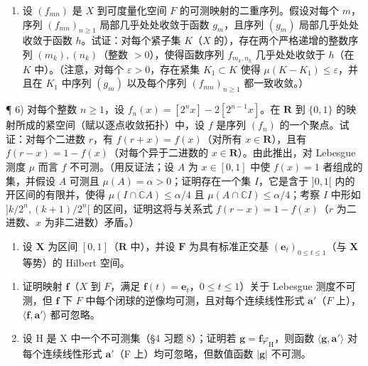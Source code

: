 \begin{enumerate}
\def\labelenumi{\arabic{enumi})}
\setcounter{enumi}{4}
\tightlist
\item
  设 \((f_{mn})\) 是 \(X\) 到可度量化空间 \(F\) 的可测映射的二重序列。假设对每个 \(m\)，序列 \((f_{mn})_{n\geqslant 1}\) 局部几乎处处收敛于函数 \(g_{m}\)，且序列 \((g_{m})\) 局部几乎处处收敛于函数 \(h\)。试证：对每个紧子集 \(K\)（\(X\) 的），存在两个严格递增的整数序列 \((m_k),(n_k)\)（整数 \(>0\)），使得函数序列 \(f_{m_k,n_k}\) 几乎处处收敛于 \(h\)（在 \(K\) 中）。（注意，对每个 \(\varepsilon >0\)，存在紧集 \(K_1\subset K\) 使得 \(\mu (K - K_1)\leqslant \varepsilon\)，并且在 \(K_{1}\) 中序列 \((g_{m})\) 以及每个序列 \((f_{mn})_{n\geqslant 1}\) 都一致收敛。）
\end{enumerate}

¶ 6) 对每个整数 \(n \geqslant 1\)，设 \(f_n(x) = [2^n x] - 2[2^{n-1}x]\)。在 \(\mathbf{R}\) 到 \(\{0,1\}\) 的映射所成的紧空间（赋以逐点收敛拓扑）中，设 \(f\) 是序列 \((f_n)\) 的一个聚点。试证：对每个二进数 \(r\)，有 \(f(r+x) = f(x)\)（对所有 \(x \in \mathbf{R}\)），且有 \(f(r-x) = 1 - f(x)\)（对每个异于二进数的 \(x \in \mathbf{R}\)）。由此推出，对 Lebesgue 测度 \(\mu\) 而言 \(f\) 不可测。（用反证法；设 \(A\) 为 \(x \in [0,1]\) 中使 \(f(x) = 1\) 者组成的集，并假设 \(A\) 可测且 \(\mu(A) = \alpha > 0\)；证明存在一个集 \(I\)，它是含于 \(]0,1[\) 内的开区间的有限并，使得 \(\mu(I \cap \mathbb{C}A) \leqslant \alpha/4\) 且 \(\mu(A \cap \mathbb{C}I) \leqslant \alpha/4\)；考察 \(I\) 中形如 \(]k/2^n, (k+1)/2^n[\) 的区间，证明这将与关系式 \(f(r-x) = 1 - f(x)\)（\(r\) 为二进数、\(x\) 为非二进数）矛盾。）

\begin{enumerate}
\def\labelenumi{\arabic{enumi})}
\setcounter{enumi}{6}
\tightlist
\item
  设 \(\mathbf{X}\) 为区间 \([0,1]\)（\(\mathbf{R}\) 中），并设 \(\mathbf{F}\) 为具有标准正交基 \((\mathbf{e}_t)_{0\leqslant t\leqslant 1}\)（与 \(\mathbf{X}\) 等势）的 Hilbert 空间。
\end{enumerate}

\begin{enumerate}
\def\labelenumi{\alph{enumi})}
\item
  证明映射 \(\mathbf{f}\)（\(X\) 到 \(F\)，满足 \(\mathbf{f}(t) = \mathbf{e}_t\)，\(0 \leqslant t \leqslant 1\)）关于 Lebesgue 测度不可测，但 \(\mathbf{f}\) 下 \(F\) 中每个闭球的逆像均可测，且对每个连续线性形式 \(\mathbf{a}'\)（\(F\) 上），\(\langle \mathbf{f}, \mathbf{a}' \rangle\) 都可忽略。
\item
  设 H 是 X 中一个不可测集（§4 习题 8）；证明若 \(\mathbf{g} = \mathbf{f}\varphi_{\mathrm{H}}\)，则函数 \(\langle \mathbf{g},\mathbf{a}'\rangle\) 对每个连续线性形式 \(\mathbf{a}'\)（F 上）均可忽略，但数值函数 \(|\mathbf{g}|\) 不可测。
\end{enumerate}

